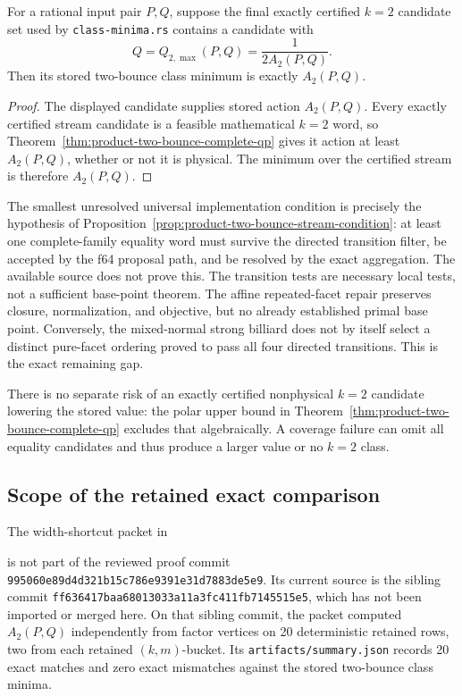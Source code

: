 \begin{unverified}
\begin{proposition}[Sufficient condition for the stored \(k=2\) value]
\label{prop:product-two-bounce-stream-condition}
For a rational input pair \(P,Q\), suppose the final exactly certified
\(k=2\) candidate set used by \texttt{class-minima.rs} contains a candidate
with
\[
 Q=Q_{2,\max}(P,Q)=\frac1{2A_2(P,Q)}.
\]
Then its stored two-bounce class minimum is exactly \(A_2(P,Q)\).
\end{proposition}

\begin{proof}
The displayed candidate supplies stored action \(A_2(P,Q)\).  Every exactly
certified stream candidate is a feasible mathematical \(k=2\) word, so
Theorem~\ref{thm:product-two-bounce-complete-qp} gives it action at least
\(A_2(P,Q)\), whether or not it is physical.  The minimum over the certified
stream is therefore \(A_2(P,Q)\).
\end{proof}
\end{unverified}

The smallest unresolved universal implementation condition is precisely the
hypothesis of
Proposition~\ref{prop:product-two-bounce-stream-condition}: at least one
complete-family equality word must survive the directed transition filter,
be accepted by the f64 proposal path, and be resolved by the exact
aggregation.  The available source does not prove this.  The transition tests
are necessary local tests, not a sufficient base-point theorem.  The affine
repeated-facet repair preserves closure, normalization, and objective, but no
already established primal base point.  Conversely, the mixed-normal strong
billiard does not by itself select a distinct pure-facet ordering proved to
pass all four directed transitions.  This is the exact remaining gap.

There is no separate risk of an exactly certified nonphysical \(k=2\)
candidate lowering the stored value: the polar upper bound in
Theorem~\ref{thm:product-two-bounce-complete-qp} excludes that algebraically.
A coverage failure can omit all equality candidates and thus produce a larger
value or no \(k=2\) class.

\subsection{Scope of the retained exact comparison}
\label{subsec:product-two-bounce-retained-evidence}

The width-shortcut packet in
\begin{center}
\end{center}
is not part of the reviewed proof commit
\texttt{995060e89d4d321b15c786e9391e31d7883de5e9}.  Its current source is
the sibling commit
\texttt{ff636417baa68013033a11a3fc411fb7145515e5}, which has not been
imported or merged here.  On that sibling commit, the packet
computed \(A_2(P,Q)\) independently from factor vertices on 20 deterministic
retained rows, two from each retained \((k,m)\)-bucket.  Its
\texttt{artifacts/summary.json} records 20 exact matches and zero exact
mismatches against the stored two-bounce class minima.

